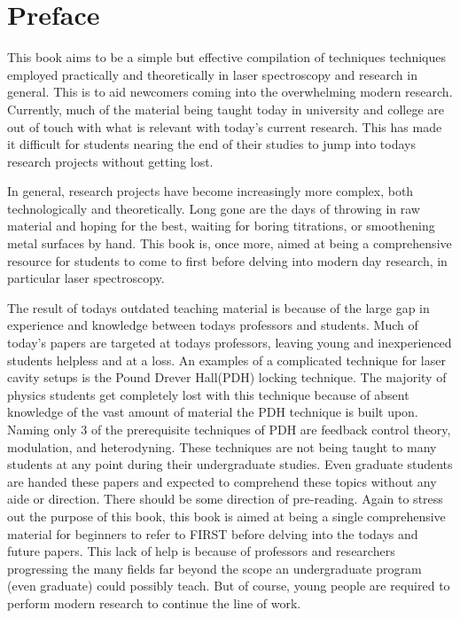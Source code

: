 \documentclass[11pt,a4paper]{book}
\begin{document}
\frontmatter


\tableofcontents

\chapter{Preface}
	\label{chp:preface}This book aims to be a simple but effective compilation of techniques techniques employed practically and theoretically in laser spectroscopy and research in general. This is to aid newcomers coming into the overwhelming modern research. Currently, much of the material being taught today in university and college are out of touch with what is relevant with today's current research. This has made it difficult for students nearing the end of their studies to jump into todays research projects without getting lost. 
	
	In general, research projects have become increasingly more complex, both technologically and theoretically. Long gone are the days of throwing in raw material and hoping for the best, waiting for boring titrations, or smoothening metal surfaces by hand. This book is, once more, aimed at being a comprehensive resource for students to come to first before delving into modern day research, in particular laser spectroscopy.
	
	The result of todays outdated teaching material is because of the large gap in experience and knowledge between todays professors and students. Much of today's papers are targeted at todays professors, leaving young and inexperienced students helpless and at a loss. An examples of a complicated technique for laser cavity setups is the Pound Drever Hall(PDH) locking technique. The majority of physics students get completely lost with this technique because of absent knowledge of the vast amount of material the PDH technique is built upon. Naming only 3 of the prerequisite techniques of PDH are feedback control theory, modulation, and heterodyning. These techniques are not being taught to many students at any point during their undergraduate studies. Even graduate students are handed these papers and expected to comprehend these topics without any aide or direction. There should be some direction of pre-reading. Again to stress out the purpose of this book, this book is aimed at being a single comprehensive material for beginners to refer to FIRST before delving into the todays and future papers. This lack of help is because of professors and researchers progressing the many fields far beyond the scope an undergraduate program (even graduate) could possibly teach. But of course, young people are required to perform modern research to continue the line of work.
		
\end{document}
